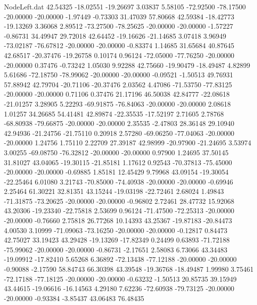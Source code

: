 \begin{filecontents}{NodeLeft.dat}
  42.54325  -18.02551  -19.26697     3.03837    5.58105  -72.92500  -78.17500  -20.00000  -20.00000   -1.97449   -0.73303   31.47039   57.80668
  42.59384  -18.42773  -19.13269     3.36068    2.89512  -73.27500  -78.25625  -20.00000  -20.00000   -1.57227   -0.86731   34.49947   29.72018
  42.64452  -19.16626  -21.14685     3.07418    3.96949  -73.02187  -76.67812  -20.00000  -20.00000   -0.83374    1.14685   31.65684   40.87645
  42.68517  -20.37476  -19.26758     0.10174    0.96124  -72.05000  -77.76250  -20.00000  -20.00000    0.37476   -0.73242    1.05030    9.92288
  42.75660  -19.90479  -18.49487     4.82899    5.61686  -72.18750  -78.99062  -20.00000  -20.00000   -0.09521   -1.50513   49.76931   57.88942
  42.79704  -20.71106  -20.37476     2.03562    4.47086  -71.53750  -77.83125  -20.00000  -20.00000    0.71106    0.37476   21.17196   46.50038
  42.84777  -22.08618  -21.01257     3.28905    5.22293  -69.91875  -76.84063  -20.00000  -20.00000    2.08618    1.01257   34.26685   54.41481
  42.89874  -22.35535  -17.52197     2.71605    2.78768  -68.80938  -79.66875  -20.00000  -20.00000    2.35535   -2.47803   28.36148   29.10940
  42.94936  -21.24756  -21.75110     0.20918    2.57280  -69.06250  -77.04063  -20.00000  -20.00000    1.24756    1.75110    2.22709   27.39187
  42.98999  -20.97900  -21.24695     3.53974    3.00255  -69.08750  -76.32812  -20.00000  -20.00000    0.97900    1.24695   37.50145   31.81027
  43.04065  -19.30115  -21.85181     1.17612    0.92543  -70.37813  -75.45000  -20.00000  -20.00000   -0.69885    1.85181   12.45429    9.79968
  43.09154  -19.30054  -22.25464     6.01080    3.21743  -70.85000  -74.40938  -20.00000  -20.00000   -0.69946    2.25464   61.30221   32.81351
  43.15244  -19.03198  -22.72461     2.68024    1.49843  -71.31875  -73.20625  -20.00000  -20.00000   -0.96802    2.72461   28.47732   15.92068
  43.20306  -19.23340  -22.75818     2.53699    0.96124  -71.47500  -72.25313  -20.00000  -20.00000   -0.76660    2.75818   26.77268   10.14393
  43.25367  -19.87183  -20.84473     4.00530    3.10999  -71.09063  -73.16250  -20.00000  -20.00000   -0.12817    0.84473   42.75027   33.19423
  43.29428  -19.13269  -17.82349     0.24499    0.63893  -71.72188  -75.99062  -20.00000  -20.00000   -0.86731   -2.17651    2.58083    6.73066
  43.34483  -19.09912  -17.82410     5.65268    6.36892  -72.13438  -77.12188  -20.00000  -20.00000   -0.90088   -2.17590   58.84743   66.30398
  43.39548  -19.36768  -18.49487     1.99980    3.75461  -72.17188  -77.18125  -20.00000  -20.00000   -0.63232   -1.50513   20.85735   39.15949
  43.44615  -19.06616  -16.14563     4.29180    7.62236  -72.60938  -79.73125  -20.00000  -20.00000   -0.93384   -3.85437   43.06483   76.48435

\end{filecontents}

